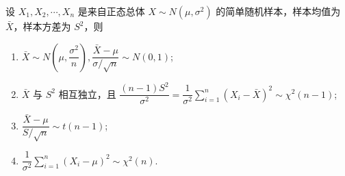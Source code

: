 \begin{theorem}[单个正态总体的抽样分布]
    设 $ X_{1}, X_{2}, \cdots, X_{n} $ 是来自正态总体 $ X \sim N\left(\mu, \sigma^{2}\right) $ 的简单随机样本，样本均值为 $ \bar{X} $，样本方差为 $ S^{2}$，则
    \begin{enumerate}[label=(\arabic{*})]
        \item $\bar{X} \sim N\left(\mu, \dfrac{\sigma^{2}}{n}\right), \dfrac{\bar{X}-\mu}{\sigma / \sqrt{n}} \sim N(0,1) $;
        \item $\bar{X} $ 与 $ S^{2} $ 相互独立，且
              $\displaystyle \dfrac{(n-1) S^{2}}{\sigma^{2}}=\dfrac{1}{\sigma^{2}} \sum_{i=1}^{n}\left(X_{i}-\bar{X}\right)^{2} \sim \chi^{2}(n-1)$;
        \item $\displaystyle \dfrac{\bar{X}-\mu}{S / \sqrt{n}} \sim t(n-1) $;
        \item $\displaystyle \dfrac{1}{\sigma^{2}} \sum_{i=1}^{n}\left(X_{i}-\mu\right)^{2} \sim \chi^{2}(n) .$
    \end{enumerate}
\end{theorem}

